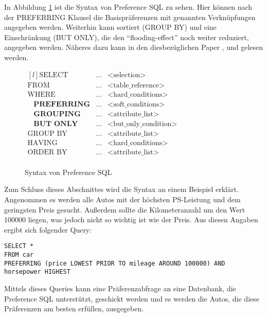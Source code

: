 {In Abbildung \ref{img:prefSQLSyntax} ist die Syntax von Preference SQL zu sehen. Hier können nach der PREFERRING Klausel die Basispräferenzen mit genannten Verknüpfungen angegeben werden. Weiterhin kann sortiert (GROUP BY) und eine Einschränkung (BUT ONLY), die den \enquote{flooding-effect} noch weiter reduziert, angegeben werden. Näheres dazu kann in den diesbezüglichen Paper \cite{kiessling2011preference}, \cite{kiessling2002foundations} und \cite{kiessling2002preference} gelesen werden.

\begin{figure}[H]
\centering
$\begin{matrix*}[l]
\text{SELECT} & \ldots & \text{<selection>} \\
\text{FROM} & \ldots & \text{<table\char`_reference>} \\
\text{WHERE} & \ldots & \text{<hard\char`_conditions>} \\
\hspace{10pt} \textbf{PREFERRING} & \ldots & \text{<soft\char`_conditions>} \\
\hspace{10pt} \textbf{GROUPING} & \ldots & \text{<attribute\char`_list>} \\
\hspace{10pt} \textbf{BUT ONLY} & \ldots & \text{<but\char`_only\char`_condition>} \\
\text{GROUP BY} & \ldots & \text{<attribute\char`_list>} \\
\text{HAVING} & \ldots & \text{<hard\char`_conditions>} \\
\text{ORDER BY} & \ldots & \text{<attribute\char`_list>} \\
\end{matrix*}$
	\caption{Syntax von Preference SQL}
	\label{img:prefSQLSyntax}
\end{figure} 

Zum Schluss dieses Abschnittes wird die Syntax an einem Beispiel erklärt.
Angenommen es werden alle Autos mit der höchsten PS-Leistung und dem geringsten Preis gesucht. Außerdem sollte die Kilometeranzahl um den Wert 100000 liegen, was jedoch nicht so wichtig ist wie der Preis.
Aus diesen Angaben ergibt sich folgender Query:
\begin{verbatim}
SELECT * 
FROM car 
PREFERRING (price LOWEST PRIOR TO mileage AROUND 100000) AND
horsepower HIGHEST
\end{verbatim}


Mittels dieses Queries kann eine Präferenzabfrage an eine Datenbank, die Preference SQL unterstützt, geschickt werden und es werden die Autos, die diese Präferenzen am besten erfüllen, ausgegeben.
}
